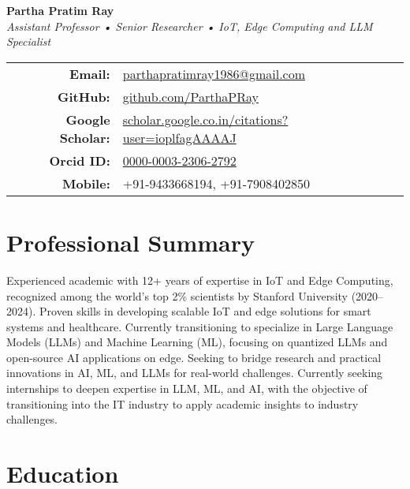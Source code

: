 \documentclass[10pt,a4paper]{article}
\begin{document}
	
	\begin{center}
		{\LARGE \textbf{Partha Pratim Ray}}\\
		\vspace{1mm}
		\textit{Assistant Professor • Senior Researcher • IoT, Edge Computing and LLM Specialist}\\
		\vspace{1mm}
		\begin{tabular}{rl}
			\textbf{Email:} & \href{mailto:parthapratimray1986@gmail.com}{parthapratimray1986@gmail.com} \\
			\textbf{GitHub:} & \href{https://github.com/ParthaPRay}{github.com/ParthaPRay} \\
			\textbf{Google Scholar:} & \href{https://scholar.google.co.in/citations?user=ioplfagAAAAJ&hl=en&oi=ao}{scholar.google.co.in/citations?user=ioplfagAAAAJ} \\
			\textbf{Orcid ID:} & \href{http://orcid.org/0000-0003-2306-2792}{0000-0003-2306-2792} \\
			\textbf{Mobile:} & +91-9433668194, +91-7908402850 \\
		\end{tabular}
	\end{center}
	
	\section*{Professional Summary}
	
Experienced academic with 12+ years of expertise in IoT and Edge Computing, recognized among the world’s top 2\% scientists by Stanford University (2020–2024). Proven skills in developing scalable IoT and edge solutions for smart systems and healthcare. Currently transitioning to specialize in Large Language Models (LLMs) and Machine Learning (ML), focusing on quantized LLMs and open-source AI applications on edge. Seeking to bridge research and practical innovations in AI, ML, and LLMs for real-world challenges. Currently seeking internships to deepen expertise in LLM, ML, and AI, with the objective of transitioning into the IT industry to apply academic insights to industry challenges.

	
	\section*{Education}
	
\end{document}
